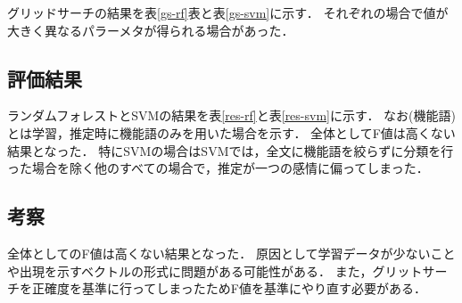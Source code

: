 グリッドサーチの結果を表\ref{gs-rf}表と表\ref{gs-svm}に示す．
それぞれの場合で値が大きく異なるパラーメタが得られる場合があった．

\subsection{評価結果}
\begin{table}[ht]
 \centering
  \caption{ランダムフォレストでの結果}
  \vspace{0.3\baselineskip}
  \label{res-rf}
\end{table}

\begin{table}[ht]
 \centering
  \caption{SVMでの結果}
  \vspace{0.3\baselineskip}
  \label{res-svm}
\end{table}

ランダムフォレストとSVMの結果を表\ref{res-rf}と表\ref{res-svm}に示す．
なお(機能語)とは学習，推定時に機能語のみを用いた場合を示す．
全体としてF値は高くない結果となった．
特にSVMの場合はSVMでは，全文に機能語を絞らずに分類を行った場合を除く他のすべての場合で，推定が一つの感情に偏ってしまった．

\subsection{考察}
全体としてのF値は高くない結果となった．
原因として学習データが少ないことや出現を示すベクトルの形式に問題がある可能性がある．
また，グリットサーチを正確度を基準に行ってしまったためF値を基準にやり直す必要がある．

